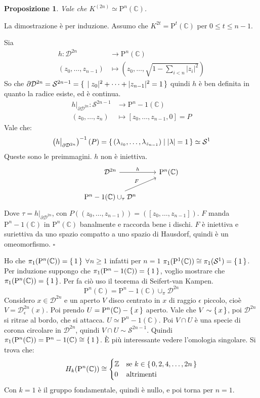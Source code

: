 \documentclass[10pt, twoside=false, x11names]{scrbook}
\newtheorem{proposition}[theorem]{Proposizione}
\newenvironment{proof}{{\textbf{Dimostrazione}:}}{\hfill $\square$}
\newcommand{\Z}{\mathbb{Z}}
\newcommand{\Pjc}[1]{\mathrm{P}^#1 (\mathbb{C})}
\newcommand{\Sph}[1][]{\mathcal{S}^#1}
\newcommand{\Disk}[1][]{\mathcal{D}^#1}
\let\setminus-
\begin{document}
\begin{proposition}
  Vale che $ K^{(2n)} \simeq \Pjc{n} $.
\end{proposition}
\begin{proof}
  La dimostrazione è per induzione. Assumo che $ K^{2t} = \Pjc{t} $ per $ 0 \leq t \leq n-1 $.

  Sia
  \begin{align*}
    h \colon \Disk{2n} & \to \Pjc{n} \\
    (z_0, \dots, z_{n-1}) & \mapsto \left(z_0,\dots, \sqrt{1 - \sum_{i < n}|z_i|^2} \right)
  \end{align*}
  So che $ \partial \Disk{2n} = \Sph{2n-1} = \set{|z_0|^2 + \dots + |z_{n-1}|^2 = 1} $
  quindi $ h $ è ben definita in quanto la radice esiste, ed è continua.
  \begin{align*}
    h \big \lvert_{\partial \Disk{2n}} \colon \Sph{2n-1} & \to \Pjc{n-1} \\
    (z_0, \dots, z_{n}) & \mapsto [z_0, \dots, z_{n-1}, 0] = P
  \end{align*}
  Vale che:
  \[
    \left( h \big \lvert_{\partial \Disk{2n}}\right)^{-1}(P) = \set{ (\lambda_{z_0}, \dots, \lambda_{z_{n-1}}) | |\lambda| = 1} \simeq \Sph{1}
  \]
  Queste sono le preimmagini. $ h $ non è iniettiva.
  \[
    \begin{tikzcd}
      \Disk{2n} \rar{h} & \Pjc{n} \\
      \Pjc{n-1} \cup_\tau \Disk{n} \arrow{ur}{F} & {}
    \end{tikzcd}
  \]
  Dove $ \tau = h \big \lvert_{\partial \Disk{2n}} $, con $ P((z_0, \dots, z_{n-1})) = ([z_0, \dots, z_{n-1}]) $.
  $ F $ manda $ \Pjc{n-1} $ in $ \Pjc{n} $ banalmente e raccorda bene i dischi.
  $ F $ è iniettiva e suriettiva da uno spazio compatto a uno spazio di Hausdorf,
  quindi è un omeomorfismo.
\end{proof}

Ho che $ \pi_1(\Pjc{n}) = \set{1} $ $ \forall n \geq 1 $
infatti per $ n = 1 $ $ \pi_1(\Pjc{1}) \cong \pi_1(\Sph[1]) = \set{1} $.
Per induzione suppongo che $ \pi_1(\Pjc{n-1}) = \set{1} $, voglio
mostrare che $ \pi_1(\Pjc{n}) = \set{1} $. Per fa ciò
uso il teorema di Seifert-van Kampen.
\[
  \Pjc{n} = \Pjc{n-1} \cup_\pi \Disk{2n}
\]
Considero $ x \in \Disk{2n} $ e un aperto $ V $ disco centrato in $ x $
di raggio $ \epsilon $ piccolo, cioè $ V = \Disk{2n}_\epsilon(x) $. Poi prendo
$ U = \Pjc{n} \setminus \set{x} $ aperto.
Vale che $ V \sim \set{x} $, poi $ \Disk{2n} $ si ritrae al bordo, che
si attacca. $ U \simeq \Pjc{n-1} $.
Poi $ V \cap U $ è una specie di corona circolare in $ \Disk{2n} $,
quindi $ V \cap U \sim \Sph{2n -1} $. Quindi $ \pi_1(\Pjc{n}) = \Pjc{n-1} \cong \set{1} $.
È più interessante vedere l'omologia singolare.
Si trova che:
\[
  H_k(\Pjc{n}) \cong
  \begin{cases}
    \Z & \text{se } k \in \set{0,2,4,\dots, 2n} \\
    0 & \text{altrimenti}
  \end{cases}
\]
Con $ k = 1 $ è il gruppo fondamentale, quindi è nullo, e poi torna per $ n = 1 $.
\end{document}
